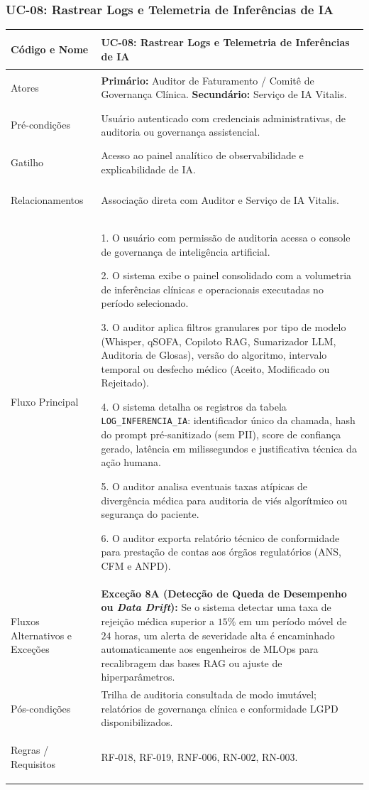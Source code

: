 \subsubsection{UC-08: Rastrear Logs e Telemetria de Inferências de IA}
\label{sec:uc08}

\begingroup
\small
\begin{tabularx}{\textwidth}{>{\bfseries\raggedright\arraybackslash}p{3.4cm} X}
\toprule
Código e Nome & UC-08: Rastrear Logs e Telemetria de Inferências de IA \\
\midrule
Atores & \textbf{Primário:} Auditor de Faturamento / Comitê de Governança Clínica. \textbf{Secundário:} Serviço de IA Vitalis. \\
Pré-condições & Usuário autenticado com credenciais administrativas, de auditoria ou governança assistencial. \\
Gatilho & Acesso ao painel analítico de observabilidade e explicabilidade de IA. \\
Relacionamentos & Associação direta com Auditor e Serviço de IA Vitalis. \\
\midrule
Fluxo Principal & 
1. O usuário com permissão de auditoria acessa o console de governança de inteligência artificial.\par
2. O sistema exibe o painel consolidado com a volumetria de inferências clínicas e operacionais executadas no período selecionado.\par
3. O auditor aplica filtros granulares por tipo de modelo (Whisper, qSOFA, Copiloto RAG, Sumarizador LLM, Auditoria de Glosas), versão do algoritmo, intervalo temporal ou desfecho médico (Aceito, Modificado ou Rejeitado).\par
4. O sistema detalha os registros da tabela \texttt{LOG\_INFERENCIA\_IA}: identificador único da chamada, hash do prompt pré-sanitizado (sem PII), score de confiança gerado, latência em milissegundos e justificativa técnica da ação humana.\par
5. O auditor analisa eventuais taxas atípicas de divergência médica para auditoria de viés algorítmico ou segurança do paciente.\par
6. O auditor exporta relatório técnico de conformidade para prestação de contas aos órgãos regulatórios (ANS, CFM e ANPD). \\
\midrule
Fluxos Alternativos e Exceções & 
\textbf{Exceção 8A (Detecção de Queda de Desempenho ou \textit{Data Drift}):} Se o sistema detectar uma taxa de rejeição médica superior a $15\%$ em um período móvel de $24$ horas, um alerta de severidade alta é encaminhado automaticamente aos engenheiros de MLOps para recalibragem das bases RAG ou ajuste de hiperparâmetros. \\
\midrule
Pós-condições & Trilha de auditoria consultada de modo imutável; relatórios de governança clínica e conformidade LGPD disponibilizados. \\
Regras / Requisitos & RF-018, RF-019, RNF-006, RN-002, RN-003. \\
\bottomrule
\end{tabularx}
\endgroup

